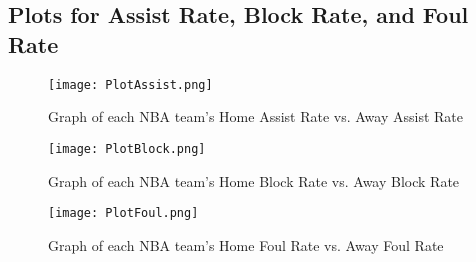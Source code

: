 \documentclass{article}
\begin{document}
\subsection{Plots for Assist Rate, Block Rate, and Foul Rate}
\begin{figure}[H]
    \centering
    \label{figassplot}
    \texttt{[image: PlotAssist.png]}
    \caption{Graph of each NBA team's Home Assist Rate vs. Away Assist Rate}
\end{figure}
\begin{figure}[H]
    \centering
    \label{figblkplot}
    \texttt{[image: PlotBlock.png]}
    \caption{Graph of each NBA team's Home Block Rate vs. Away Block Rate}
\end{figure}
\begin{figure}[H]
    \centering
    \label{figpflplot}
    \texttt{[image: PlotFoul.png]}
    \caption{Graph of each NBA team's Home Foul Rate vs. Away Foul Rate}
\end{figure}




\end{document}
